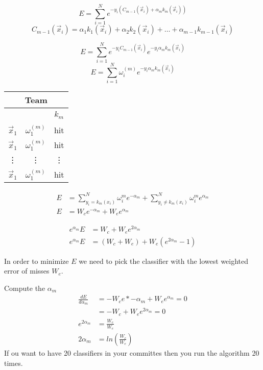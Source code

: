 \documentclass[letterpaper, 9pt]{article}
\begin{document}
\begin{equation}
E = \sum^{N}_{i=1}e^{-y_i (C_{m-1}(\vec{x}_i) + \alpha_m k_m(\vec{x}_i))}
\end{equation}
\begin{equation}
C_{m-1}(\vec{x}_i) = \alpha_1k_1(\vec{x}_i) + \alpha_2  k_2(\vec{x}_i) + \dots + \alpha_{m-1}k_{m-1}(\vec{x}_i)
\end{equation}

\begin{equation}
E = \sum_{i=1}^{N} e^{-y_iC_{m-1}(\vec{x}_i)}e^{-y_i\alpha_mk_m(\vec{x}_i)}
\end{equation}
\begin{equation}
E = \sum_{i=1}^N \omega_i^{(m)}e^{-y_i\alpha_mk_m(\vec{x}_i)}
\end{equation}

\begin{tabular}{|c|c|c|}
\hline
\multicolumn{3}{|c|}{Team} \\ \hline
~ & ~ & $k_m$ \\ \hline
$\vec{x}_1$ & $\omega_1^{(m)}$ & hit \\
$\vec{x}_1$ & $\omega_1^{(m)}$ & hit \\
\vdots & \vdots & \vdots \\
$\vec{x}_1$ & $\omega_1^{(m)}$ & hit \\
\end{tabular}

\begin{equation}
\begin{split}
E &= \sum_{y_i = k_m(x_i)}^N \omega_i^m e^{-\alpha_m} + \sum_{y_i \neq k_m(x_i)}^N \omega_i^m e^{\alpha_m} \\
E &= W_c e^{-\alpha_m} + W_e e^{\alpha_m}
\end{split}
\end{equation}

\begin{equation}
\begin{split}
e^{\alpha_m}E &= W_c + W_e e^{2\alpha_m} \\
e^{\alpha_m}E &= (W_c + W_e) + W_e(e^{2\alpha_m} - 1)
\end{split}
\end{equation}

In order to minimize $E$ we need to pick the classifier with the lowest weighted error of misses $W_e$.

Compute the $\alpha_m$
\begin{equation}
\begin{split}
\frac{dE}{d\alpha_m} &= -W_c e *{-\alpha_m} + W_ee^{\alpha_m} = 0 \\
&= -W_c + W_e e^{2\alpha_m} = 0 \\
e^{2\alpha_m} &= \frac{W_c}{W_e} \\
2\alpha_m &= ln \left (\frac{W_c}{W_e} \right )
\end{split}
\end{equation}
If ou want to have 20 classifiers in your committes then you run the algorithm 20 times.
\end{document}
